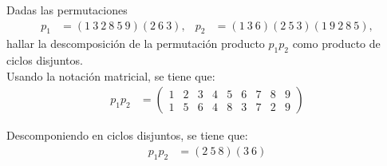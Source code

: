 \begin{ejercicio}\label{ej:2.15}
    Dadas las permutaciones
    \begin{align*}
        p_1 &= (1\ 3\ 2\ 8\ 5\ 9)(2\ 6\ 3), &
        p_2 &= (1\ 3\ 6)(2\ 5\ 3)(1\ 9\ 2\ 8\ 5),
    \end{align*}
    hallar la descomposición de la permutación producto $p_1p_2$ como producto de ciclos disjuntos.\\

    Usando la notación matricial, se tiene que:
    \begin{align*}
        p_1p_2 &=
        \begin{pmatrix}
            1 & 2 & 3 & 4 & 5 & 6 & 7 & 8 & 9 \\
            1 & 5 & 6 & 4 & 8 & 3 & 7 & 2 & 9
        \end{pmatrix}
    \end{align*}

    Descomponiendo en ciclos disjuntos, se tiene que:
    \begin{align*}
        p_1p_2 &= (2\ 5\ 8)(3\ 6)
    \end{align*}
\end{ejercicio}

